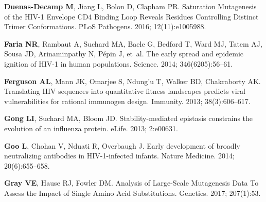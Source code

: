 \documentclass[9pt]{elife}
\begin{document}
\begin{thebibliography}{114}
\textbf{\color{eLifeMediumGrey} Duenas-Decamp M}, Jiang L, Bolon D, Clapham PR.
\newblock Saturation Mutagenesis of the {HIV-1} Envelope {CD4} Binding Loop
  Reveals Residues Controlling Distinct Trimer Conformations.
\newblock PLoS Pathogens.  2016; 12(11):e1005988.

\textbf{\color{eLifeMediumGrey} Faria NR}, Rambaut A, Suchard MA, Baele G,
  Bedford T, Ward MJ, Tatem AJ, Sousa JD, Arinaminpathy N, P{\'e}pin J, et~al.
\newblock The early spread and epidemic ignition of {HIV-1} in human
  populations.
\newblock Science.  2014; 346(6205):56--61.

\textbf{\color{eLifeMediumGrey} Ferguson AL}, Mann JK, Omarjee S, Ndung’u T,
  Walker BD, Chakraborty AK.
\newblock Translating {HIV} sequences into quantitative fitness landscapes
  predicts viral vulnerabilities for rational immunogen design.
\newblock Immunity.  2013; 38(3):606--617.

\textbf{\color{eLifeMediumGrey} Gong LI}, Suchard MA, Bloom JD.
\newblock Stability-mediated epistasis constrains the evolution of an influenza
  protein.
\newblock eLife.  2013; 2:e00631.

\textbf{\color{eLifeMediumGrey} Goo L}, Chohan V, Nduati R, Overbaugh J.
\newblock Early development of broadly neutralizing antibodies in
  HIV-1-infected infants.
\newblock Nature Medicine.  2014; 20(6):655--658.

\textbf{\color{eLifeMediumGrey} Gray VE}, Hause RJ, Fowler DM.
\newblock Analysis of Large-Scale Mutagenesis Data To Assess the Impact of
  Single Amino Acid Substitutions.
\newblock Genetics.  2017; 207(1):53.


\end{thebibliography}
\end{document}
